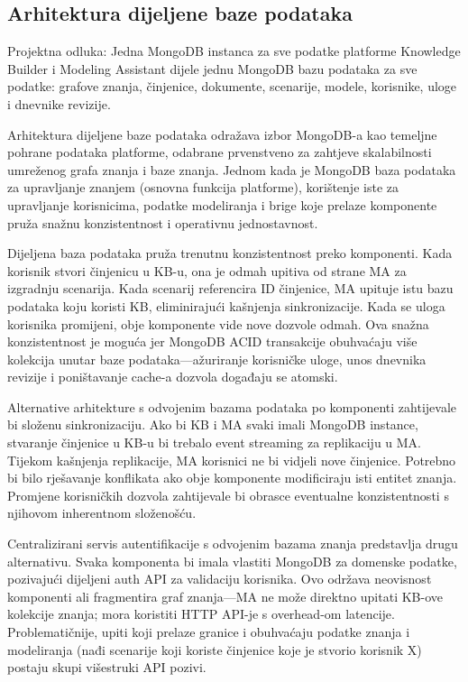 \documentclass[12pt,a4paper]{article}
\begin{document}
\subsection{Arhitektura dijeljene baze podataka}

\begin{rationale}{Projektna odluka: Jedna MongoDB instanca za sve podatke platforme}
Knowledge Builder i Modeling Assistant dijele jednu MongoDB bazu podataka za sve podatke: grafove znanja, činjenice, dokumente, scenarije, modele, korisnike, uloge i dnevnike revizije.
\end{rationale}

Arhitektura dijeljene baze podataka odražava izbor MongoDB-a kao temeljne pohrane podataka platforme, odabrane prvenstveno za zahtjeve skalabilnosti umreženog grafa znanja i baze znanja. Jednom kada je MongoDB baza podataka za upravljanje znanjem (osnovna funkcija platforme), korištenje iste za upravljanje korisnicima, podatke modeliranja i brige koje prelaze komponente pruža snažnu konzistentnost i operativnu jednostavnost.

Dijeljena baza podataka pruža trenutnu konzistentnost preko komponenti. Kada korisnik stvori činjenicu u KB-u, ona je odmah upitiva od strane MA za izgradnju scenarija. Kada scenarij referencira ID činjenice, MA upituje istu bazu podataka koju koristi KB, eliminirajući kašnjenja sinkronizacije. Kada se uloga korisnika promijeni, obje komponente vide nove dozvole odmah. Ova snažna konzistentnost je moguća jer MongoDB ACID transakcije obuhvaćaju više kolekcija unutar baze podataka—ažuriranje korisničke uloge, unos dnevnika revizije i poništavanje cache-a dozvola događaju se atomski.

Alternative arhitekture s odvojenim bazama podataka po komponenti zahtijevale bi složenu sinkronizaciju. Ako bi KB i MA svaki imali MongoDB instance, stvaranje činjenice u KB-u bi trebalo event streaming za replikaciju u MA. Tijekom kašnjenja replikacije, MA korisnici ne bi vidjeli nove činjenice. Potrebno bi bilo rješavanje konflikata ako obje komponente modificiraju isti entitet znanja. Promjene korisničkih dozvola zahtijevale bi obrasce eventualne konzistentnosti s njihovom inherentnom složenošću.

Centralizirani servis autentifikacije s odvojenim bazama znanja predstavlja drugu alternativu. Svaka komponenta bi imala vlastiti MongoDB za domenske podatke, pozivajući dijeljeni auth API za validaciju korisnika. Ovo održava neovisnost komponenti ali fragmentira graf znanja—MA ne može direktno upitati KB-ove kolekcije znanja; mora koristiti HTTP API-je s overhead-om latencije. Problematičnije, upiti koji prelaze granice i obuhvaćaju podatke znanja i modeliranja (nađi scenarije koji koriste činjenice koje je stvorio korisnik X) postaju skupi višestruki API pozivi.
\end{document}
